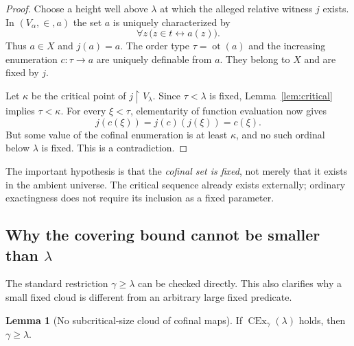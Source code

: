 \documentclass[11pt,letterpaper]{article}
\theoremstyle{definition}
\newtheorem{lemma}[definition]{Lemma}
\newcommand{\CEx}{\operatorname{CEx}}
\newcommand{\ot}{\operatorname{ot}}
\newcommand{\restr}{\mathbin{\upharpoonright}}
\begin{document}
\begin{proof}
Choose a height well above $\lambda$ at which the alleged relative witness $j$ exists. In $(V_\alpha,\in,a)$ the set $a$ is uniquely characterized by
\[
 \forall z\,\bigl(z\in t\longleftrightarrow a(z)\bigr).
\]
Thus $a\in X$ and $j(a)=a$. The order type $\tau=\ot(a)$ and the increasing enumeration $c:\tau\to a$ are uniquely definable from $a$. They belong to $X$ and are fixed by $j$.

Let $\kappa$ be the critical point of $j\restr V_\lambda$. Since $\tau<\lambda$ is fixed, Lemma~\ref{lem:critical} implies $\tau<\kappa$. For every $\xi<\tau$, elementarity of function evaluation now gives
\[
 j(c(\xi))=j(c)(j(\xi))=c(\xi).
\]
But some value of the cofinal enumeration is at least $\kappa$, and no such ordinal below $\lambda$ is fixed. This is a contradiction.
\end{proof}

The important hypothesis is that the \emph{cofinal set is fixed}, not merely that it exists in the ambient universe. The critical sequence already exists externally; ordinary exactingness does not require its inclusion as a fixed parameter.


\subsection{Why the covering bound cannot be smaller than $\lambda$}

The standard restriction $\gamma\geq\lambda$ can be checked directly. This also clarifies why a small fixed cloud is different from an arbitrary large fixed predicate.

\begin{lemma}[No subcritical-size cloud of cofinal maps]\label{lem:bound}
If $\CEx_\gamma(\lambda)$ holds, then $\gamma\geq\lambda$.
\end{lemma}
\end{document}
